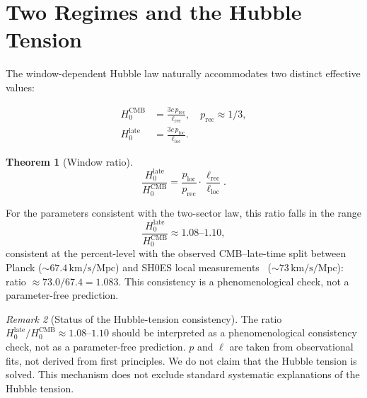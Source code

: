 \documentclass[12pt,a4paper]{amsart}
\theoremstyle{plain}
\newtheorem{theorem}{Theorem}[section]
\theoremstyle{definition}
\theoremstyle{remark}
\newtheorem{remark}[theorem]{Remark}
\newcommand{\Hzero}{H_0}
\begin{document}
\section{Two Regimes and the Hubble Tension}
\label{sec:tworegimes}

The window-dependent Hubble law naturally accommodates two distinct effective values:

\begin{align}
  \Hzero^{\mathrm{CMB}} &= \frac{3c\,p_{\mathrm{rec}}}{\ell_{\mathrm{rec}}},
    \quad p_{\mathrm{rec}}\approx 1/3,\label{eq:HCMB}\\
  \Hzero^{\mathrm{late}} &= \frac{3c\,p_{\mathrm{loc}}}{\ell_{\mathrm{loc}}}.
    \label{eq:Hlate}
\end{align}

\begin{theorem}[Window ratio]
  \label{thm:Hratio}
  \begin{equation}
    \frac{\Hzero^{\mathrm{late}}}{\Hzero^{\mathrm{CMB}}}
      = \frac{p_{\mathrm{loc}}}{p_{\mathrm{rec}}}\cdot
        \frac{\ell_{\mathrm{rec}}}{\ell_{\mathrm{loc}}}.
    \label{eq:Hratio}
  \end{equation}
\end{theorem}

For the parameters consistent with the two-sector law, this ratio
falls in the range
\begin{equation}
  \frac{\Hzero^{\mathrm{late}}}{\Hzero^{\mathrm{CMB}}}\approx 1.08\text{--}1.10,
\end{equation}
consistent at the percent-level with the observed CMB--late-time split between Planck
($\sim 67.4\,\mathrm{km/s/Mpc}$) and SH0ES local
measurements~\cite{Riess2022} ($\sim 73\,\mathrm{km/s/Mpc}$):
ratio $\approx 73.0/67.4=1.083$. This consistency is a phenomenological check, not a parameter-free prediction.

\begin{remark}[Status of the Hubble-tension consistency]
  The ratio $\Hzero^{\mathrm{late}}/\Hzero^{\mathrm{CMB}}\approx 1.08$--$1.10$
  should be interpreted as a phenomenological consistency check, not
  as a parameter-free prediction. $p$ and $\ell$ are taken from
  observational fits, not derived from first principles. We do not
  claim that the Hubble tension is solved. This mechanism does
  not exclude standard systematic explanations of the Hubble tension.
\end{remark}
\end{document}
